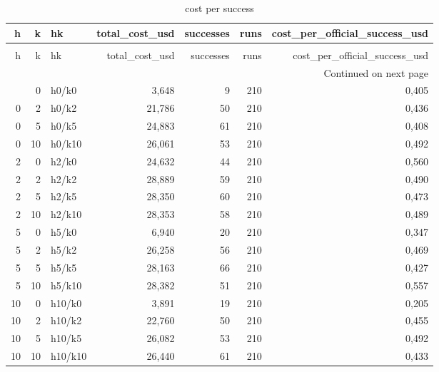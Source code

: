 \begin{longtable}{rrlrrrr}
\caption{cost per success} \label{tab:cost_per_success} \\
\toprule
h & k & hk & total\_cost\_usd & successes & runs & cost\_per\_official\_success\_usd \\
\midrule
\endfirsthead
\caption[]{cost per success} \\
\toprule
h & k & hk & total\_cost\_usd & successes & runs & cost\_per\_official\_success\_usd \\
\midrule
\endhead
\midrule
\multicolumn{7}{r}{Continued on next page} \\
\midrule
\endfoot
\bottomrule
\endlastfoot
0 & 0 & h0/k0 & 3,648 & 9 & 210 & 0,405 \\
0 & 2 & h0/k2 & 21,786 & 50 & 210 & 0,436 \\
0 & 5 & h0/k5 & 24,883 & 61 & 210 & 0,408 \\
0 & 10 & h0/k10 & 26,061 & 53 & 210 & 0,492 \\
2 & 0 & h2/k0 & 24,632 & 44 & 210 & 0,560 \\
2 & 2 & h2/k2 & 28,889 & 59 & 210 & 0,490 \\
2 & 5 & h2/k5 & 28,350 & 60 & 210 & 0,473 \\
2 & 10 & h2/k10 & 28,353 & 58 & 210 & 0,489 \\
5 & 0 & h5/k0 & 6,940 & 20 & 210 & 0,347 \\
5 & 2 & h5/k2 & 26,258 & 56 & 210 & 0,469 \\
5 & 5 & h5/k5 & 28,163 & 66 & 210 & 0,427 \\
5 & 10 & h5/k10 & 28,382 & 51 & 210 & 0,557 \\
10 & 0 & h10/k0 & 3,891 & 19 & 210 & 0,205 \\
10 & 2 & h10/k2 & 22,760 & 50 & 210 & 0,455 \\
10 & 5 & h10/k5 & 26,082 & 53 & 210 & 0,492 \\
10 & 10 & h10/k10 & 26,440 & 61 & 210 & 0,433 \\
\end{longtable}
